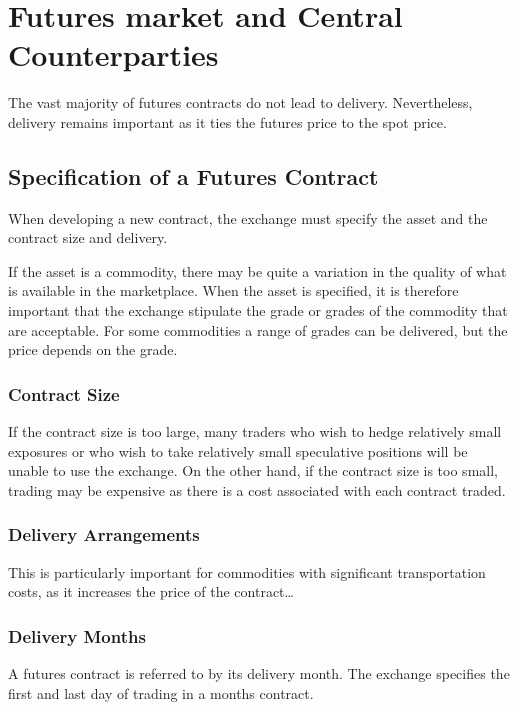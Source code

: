 \usetikzlibrary{graphs}
\usetikzlibrary{graphs.standard}

\section{Futures market and Central Counterparties}\label{sec:2}

The vast majority of futures contracts do not lead to delivery. Nevertheless,
delivery remains important as it ties the futures price to the spot price.

\subsection{Specification of a Futures Contract}

When developing a new contract, the exchange must specify the asset and the
contract size and delivery.

If the asset is a commodity, there may be quite a variation in the quality of what is
available in the marketplace. When the asset is specified, it is therefore important that the exchange stipulate the grade or grades of the commodity that are acceptable. For some commodities a range of grades can be delivered, but the price depends on the grade.

\subsubsection*{Contract Size}

If the contract size is too large, many traders who wish to hedge relatively small exposures or who wish to take relatively small speculative positions will be unable to use the exchange. On the other hand, if the contract size is too small, trading may be expensive as there is a cost associated with each contract traded.

\subsubsection*{Delivery Arrangements}

This is particularly important for commodities with significant transportation costs, as it increases the price of the contract\dots

\subsubsection*{Delivery Months}

A futures contract is referred to by its delivery month. The exchange specifies the first and last day of trading in a months contract.

